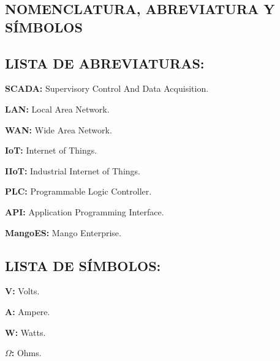 \begin{center}
    \section*{NOMENCLATURA, ABREVIATURA Y SÍMBOLOS}
    \thispagestyle{empty}
\end{center}
\justify

\begin{list}{}{}

    \subsection*{LISTA DE ABREVIATURAS:}
    
        \item \textbf{SCADA:} Supervisory Control And Data Acquisition.
        \item \textbf{LAN:}  Local Area Network.
        \item \textbf{WAN:}  Wide Area Network.
        \item \textbf{IoT:} Internet of Things.
        \item \textbf{IIoT:} Industrial Internet of Things.
        \item \textbf{PLC:} Programmable Logic Controller.
        \item \textbf{API:} Application Programming Interface.
        \item \textbf{MangoES:} Mango Enterprise.
    
    \subsection*{LISTA DE SÍMBOLOS:}
    
        \item \textbf{V:} Volts.
        \item \textbf{A:} Ampere.
        \item \textbf{W:} Watts.
        \item \textbf{$\Omega$:} Ohms.
    
    \end{list}

\newpage